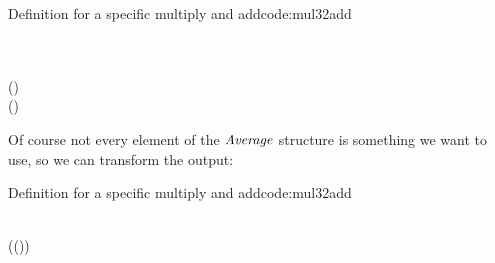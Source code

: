 \begin{texexptitled}{Definition for a specific multiply and add}{code:mul32add}
\begin{hscode}
%
%
%
\>[B]{}\mathbin{::}\langle{}\rangle\to {}\langle{}\rangle\to {}\langle{}\rangle{}\<[E]%
\\
\>[B]{}\;\;\mathrel{=}{}\<[E]%
\\
\>[B]{}\<[5]%
\>[5]{}\;\mathrel{=}(\mathbin{+})\mathbin{/}\<[E]%
\\
\>[B]{}\<[5]%
\>[5]{}\;{}\<[9]%
\>[9]{}\;\leftarrow(\;\;\;\mathbin{::}\langle{}\rangle){}\<[E]%
\ColumnHook
\end{hscode}\resethooks
\end{texexptitled}
Of course not every element of the \ensuremath{\Conid{Average}} structure is something we want to use, so we can transform the output:
\begin{texexptitled}{Definition for a specific multiply and add}{code:mul32add}
\begin{hscode}\SaveRestoreHook
{}%
%
\>[B]{}\mathbin{::}\langle{}\rangle\to {}\langle{}\rangle\to {}\langle{}\rangle{}\<[E]%
\\
\>[B]{}\mathrel{=}(\lambda(\;\;\;)\to {})\mathbin{\circ}\<[E]%
\ColumnHook
\end{hscode}\resethooks
\end{texexptitled}

